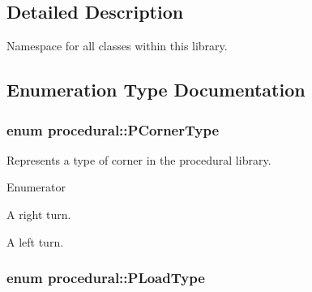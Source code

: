 \subsection{Detailed Description}
Namespace for all classes within this library. 

\subsection{Enumeration Type Documentation}
\hypertarget{namespaceprocedural_ac5486560c59bdf79345a041628149e91}{
\subsubsection[{P\-Corner\-Type}]{\setlength{\rightskip}{0pt plus 5cm}enum {\bf procedural\-::\-P\-Corner\-Type}}}\label{namespaceprocedural_ac5486560c59bdf79345a041628149e91}


Represents a type of corner in the procedural library. 

\begin{Desc}
\item[Enumerator]\par
\begin{description}
\item[{\em 
\hypertarget{namespaceprocedural_ac5486560c59bdf79345a041628149e91a51e953992f324191b7293ff8fe7ce244}{C\-T\-Right}\label{namespaceprocedural_ac5486560c59bdf79345a041628149e91a51e953992f324191b7293ff8fe7ce244}
}]A right turn. \item[{\em 
\hypertarget{namespaceprocedural_ac5486560c59bdf79345a041628149e91ace6190b113a7b2280f191327256f5e25}{C\-T\-Left}\label{namespaceprocedural_ac5486560c59bdf79345a041628149e91ace6190b113a7b2280f191327256f5e25}
}]A left turn. \end{description}
\end{Desc}
\hypertarget{namespaceprocedural_a1a0de85ffebb5ee366eb8374b42edac7}{
\subsubsection[{P\-Load\-Type}]{\setlength{\rightskip}{0pt plus 5cm}enum {\bf procedural\-::\-P\-Load\-Type}}}\label{namespaceprocedural_a1a0de85ffebb5ee366eb8374b42edac7}


